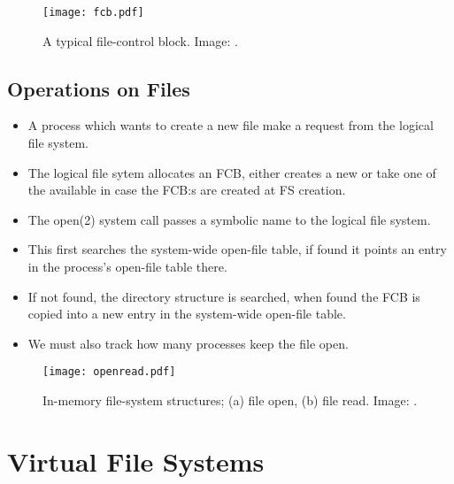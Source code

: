 \documentclass{beamer}
\begin{document}
\begin{frame}{\insertsubsectionhead}
  \begin{figure}
    \texttt{[image: fcb.pdf]}
    \caption{A typical file-control block.
      Image: \cite{Silberschatz2013osc}.}
  \end{figure}
\end{frame}

\subsection{Operations on Files}

\begin{frame}{\insertsubsectionhead}
  \begin{itemize}
    \item A process which wants to create a new file make a request from the 
      logical file system.

    \item The logical file sytem allocates an FCB, either creates a new or take 
      one of the available in case the FCB:s are created at FS creation.

    \item The open(2) system call passes a symbolic name to the logical file 
      system.

    \item This first searches the system-wide open-file table, if found it 
      points an entry in the process's open-file table there.

    \item If not found, the directory structure is searched, when found the FCB 
      is copied into a new entry in the system-wide open-file table.

    \item We must also track how many processes keep the file open.

  \end{itemize}
\end{frame}

\begin{frame}{\insertsubsectionhead}
  \begin{figure}
    \texttt{[image: openread.pdf]}
    \caption{In-memory file-system structures; (a) file open, (b) file read.
      Image: \cite{Silberschatz2013osc}.}
  \end{figure}
\end{frame}


\section{Virtual File Systems}
\end{document}
